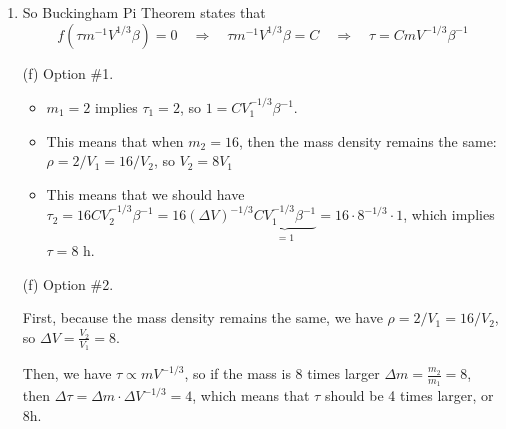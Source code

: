 \begin{enumerate}
\begin{enumerate}
\item So Buckingham Pi Theorem states that
\[ 
f(\tau m^{-1} V^{1/3} \beta) = 0 
	\quad \Rightarrow\quad  \tau m^{-1} V^{1/3} \beta = C
	\quad \Rightarrow\quad  \tau = C m V^{-1/3} \beta^{-1}
\]

\item[(f)] Option \#1.

\begin{itemize}
	\item $m_1=2$ implies $\tau_1 = 2$, so $ 1 = C V_1^{-1/3} \beta^{-1}$.
	\item This means that when $m_2=16$, then the mass density remains the same: $\rho = 2/V_1 = 16/V_2$, so $V_2 = 8 V_1$
	\item This means that we should have $\displaystyle\tau_2 = 16 C  V_2^{-1/3} \beta^{-1} =  16 (\Delta V)^{-1/3} \underbrace{C V_1^{-1/3} \beta^{-1}}_{=1} = 16 \cdot 8^{-1/3} \cdot 1$, which implies $\tau = 8$ h.
\end{itemize}

\item[(f)] Option \#2.

First, because the mass density remains the same, we have $\rho = 2/V_1 = 16/V_2$, so $\Delta V = \frac{V_2}{V_1} = 8$.

Then, we have $\tau \propto m V^{-1/3}$, so if the mass is 8 times larger $\Delta m = \frac{m_2}{m_1} = 8$, then $\Delta \tau = \Delta m \cdot \Delta V^{-1/3} = 4$, which means that $\tau$ should be 4 times larger, or 8h.



\end{enumerate}


\end{enumerate}
